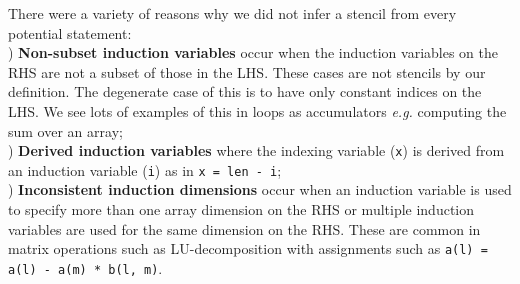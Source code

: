 \documentclass[10pt,preprint]{sigplanconf}
\theoremstyle{definition}
\newcommand{\eg}{\emph{e.g.}}
\begin{document}
There were a variety of reasons why we did not infer a
stencil from every potential statement: \\
) \textbf{Non-subset induction variables} occur when the
induction variables on the RHS are not a subset of those in the LHS. These
cases are not stencils by our definition. The degenerate case of this
is to have only constant indices on the LHS. We see lots of examples
of this in loops as accumulators \eg{} computing the sum over an array; \\
) \textbf{Derived induction variables} where the
indexing variable (\texttt{x}) is derived from an
induction variable (\texttt{i}) as in
\texttt{x = len - i};  \\
) \textbf{Inconsistent induction dimensions} occur when
an induction variable is used to specify more than one array dimension
on the RHS or multiple induction variables are used for the same
dimension on the RHS. These are common in matrix operations such as
LU-decomposition with assignments such as
\texttt{a(l) = a(l) - a(m) * b(l, m)}.






\end{document}
